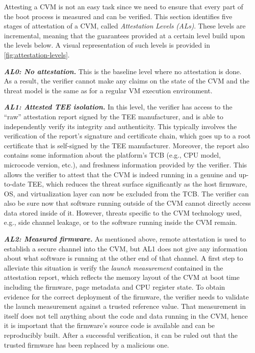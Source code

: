 Attesting a \ac{CVM} is not an easy task since we need to ensure that every part
of the boot process is measured and can be verified. This section identifies
five stages of attestation of a \ac{CVM}, called \emph{Attestation Levels (ALs)}.
These levels are incremental, meaning that the guarantees provided at a certain
level build upon the levels below. A visual representation of such levels is
provided in \cref{fig:attestation-levels}.

\noindent\textbf{\emph{AL0: No attestation.}}
%
This is the baseline level where no attestation is done. As a result, the
verifier cannot make any claims on the state of the \ac{CVM} and the threat
model is the same as for a regular VM execution environment.

\noindent\textbf{\emph{AL1: Attested \ac{TEE} isolation.}}
%
In this level, the verifier has access to the ``raw'' attestation report signed
by the \ac{TEE} manufacturer, and is able to independently verify its integrity
and authenticity. This typically involves the verification of the report's
signature and certificate chain, which goes up to a root certificate that is
self-signed by the \ac{TEE} manufacturer. Moreover, the report also contains
some information about the platform's \ac{TCB} (e.g., CPU model, microcode
version, etc.), and freshness information provided by the verifier. This allows
the verifier to attest that the \ac{CVM} is indeed running in a genuine and
up-to-date \ac{TEE}, which reduces the threat surface significantly as the host
firmware, OS, and virtualization layer can now be excluded from the TCB. The
verifier can also be sure now that software running outside of the CVM cannot
directly access data stored inside of it. However, threats specific to the CVM
technology used, e.g., side channel leakage, or to the software running inside
the \ac{CVM} remain.   

\noindent\textbf{\emph{AL2: Measured firmware.}}
%
As mentioned above, remote attestation is used to establish a secure channel
into the \ac{CVM}, but AL1 does not give any information about what software is
running at the other end of that channel. A first step to alleviate this
situation is verify the \emph{launch measurement} contained in the attestation
report, which reflects the memory layout of the \ac{CVM} at boot time including
the firmware, page metadata and CPU register state. To obtain evidence for the
correct deployment of the firmware, the verifier needs to validate the launch
measurement against a trusted reference value. That measurement in itself does
not tell anything about the code and data running in the \ac{CVM}, hence it is
important that the firmware's source code is available and can be reproducibly
built.  After a successful verification, it can be ruled out that the trusted
firmware has been replaced by a malicious one.

